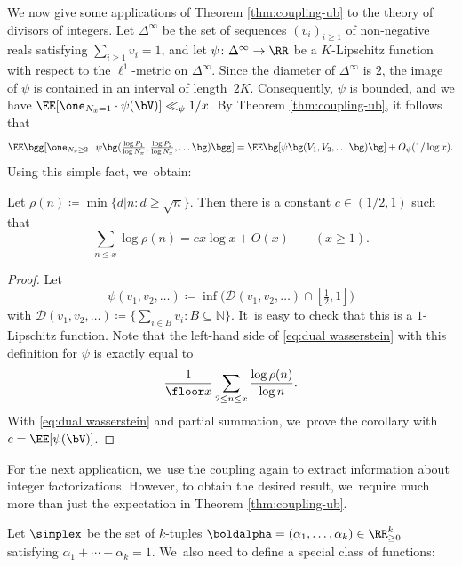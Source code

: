 
We now give some applications of Theorem \ref{thm:coupling-ub} to the theory of divisors of integers.
Let $\Delta^{\infty}$ be the set of sequences $(v_i)_{i \ge 1}$ of non-negative reals satisfying $\sum_{i \ge 1} v_i = 1$, and let $\psi\colon \Delta^{\infty} \to \RR$ be a $K$-Lipschitz function with respect to the $\ell^1$-metric on $\Delta^\infty$. Since the diameter of $\Delta^\infty$ is $2$, the image of $\psi$ is contained in an interval of length~$2K$. Consequently, $\psi$ is bounded, and we have $\EE[\one_{N_x = 1}\cdot \psi(\bV)] \ll_{\psi} 1/x$. By Theorem \ref{thm:coupling-ub}, it follows that
\begin{equation}
\label{eq:dual wasserstein}
\EE\bgg[\one_{N_x \ge 2}\cdot \psi\bg(\tfrac{\log P_1}{\log N_x}, \tfrac{\log P_2}{\log N_x}, \ldots\bg)\bgg] = \EE\bg[\psi\bg(V_1, V_2, \ldots\bg)\bg] + O_\psi(1/\log x).
\end{equation}
Using this simple fact, we~obtain:
\begin{cor}
Let $\rho(n) \coloneqq \min\{d|n : d\ge \sqrt n\}$. Then there is a constant $c \in (1/2,1)$ such that
\[
\sum_{n\le x} \log \rho(n) = cx\log x + O(x) \qquad (x \ge 1).
\]
\end{cor}

\begin{proof}
Let
\[
\psi(v_1, v_2, \ldots) \coloneqq \inf \big( \mathcal D(v_1, v_2, \ldots) \cap [\tfrac{1}{2}, 1]\big)
\]
with $\mathcal D(v_1, v_2, \ldots) \coloneqq \{\sum_{i \in B} v_i : B\subseteq \mathbb N\}$. It~is easy to check that this is a $1$-Lipschitz function. Note that the left-hand side of \eqref{eq:dual wasserstein} with this definition for $\psi$ is exactly equal to
\[
\frac{1}{\floor x} \sum_{2 \le n \le x} \frac{\log \rho(n)}{\log n}.
\]
With \eqref{eq:dual wasserstein} and partial summation, we~prove the corollary with $c = \EE[\psi(\bV)]$.
\end{proof}

For the next application, we~use the coupling again to extract information about integer factorizations. However, to obtain the desired result, we~require much more than just the expectation in Theorem \ref{thm:coupling-ub}.

Let $\simplex$ be the set of $k$-tuples $\boldalpha=(\alpha_1, \ldots, \alpha_k) \in \RR^k_{\ge 0}$ satisfying $\alpha_1+\cdots+\alpha_k=1$. We~also need to define a special class of functions:

